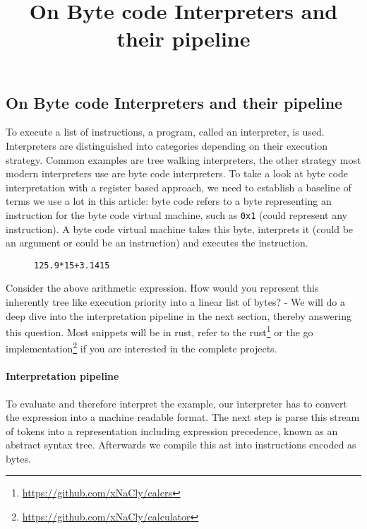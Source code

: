 

\title{On Byte code Interpreters and their pipeline}


    \subsection*{On Byte code Interpreters and their pipeline}

    To execute a list of instructions, a program, called an interpreter, is
    used. Interpreters are distinguished into categories depending on their
    execution strategy. Common examples are tree walking interpreters, the
    other strategy most modern interpreters use are byte code interpreters. To
    take a look at byte code interpretation with a register based approach, we
    need to establish a baseline of terms we use a lot in this article: byte
    code refers to a byte representing an instruction for the byte code virtual
    machine, such as \texttt{0x1} (could represent any instruction). A byte
    code virtual machine takes this byte, interprets it (could be an argument
    or could be an instruction) and executes the instruction.

    \begin{figure}[H]
        \centering
        \texttt{125.9*15+3.1415}
    \end{figure}

    Consider the above arithmetic expression. How would you represent this
    inherently tree like execution priority into a linear list of bytes? - We
    will do a deep dive into the interpretation pipeline in the next section,
    thereby answering this question. Most snippets will be in rust, refer to
    the
    rust\footnote{\href{https://github.com/xNaCly/calcrs}{https://github.com/xNaCly/calcrs}}
    or the go
    implementation\footnote{\href{https://github.com/xNaCly/calculator}{https://github.com/xNaCly/calculator}}
    if you are interested in the complete projects.

    \paragraph*{Interpretation pipeline} To evaluate and therefore interpret
    the example, our interpreter has to convert the expression into a machine
    readable format. The next step is parse this stream of tokens into a
    representation including expression precedence, known as an abstract syntax
    tree. Afterwards we compile this ast into instructions encoded as bytes.


